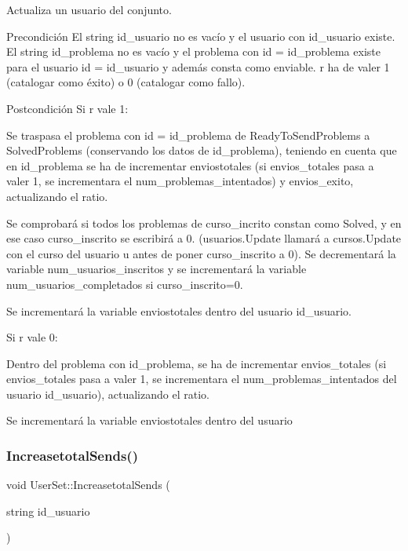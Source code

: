 Actualiza un usuario del conjunto. 

\begin{DoxyPrecond}{Precondición}
El string id\+\_\+usuario no es vacío y el usuario con id\+\_\+usuario existe. El string id\+\_\+problema no es vacío y el problema con id = id\+\_\+problema existe para el usuario id = id\+\_\+usuario y además consta como enviable. r ha de valer 1 (catalogar como éxito) o 0 (catalogar como fallo). 
\end{DoxyPrecond}
\begin{DoxyPostcond}{Postcondición}
Si r vale 1\+:
\begin{DoxyItemize}
\item Se traspasa el problema con id = id\+\_\+problema de Ready\+To\+Send\+Problems a Solved\+Problems (conservando los datos de id\+\_\+problema), teniendo en cuenta que en id\+\_\+problema se ha de incrementar enviostotales (si envios\+\_\+totales pasa a ~\newline
 valer 1, se incrementara el num\+\_\+problemas\+\_\+intentados) y envios\+\_\+exito, actualizando el ratio.
\item Se comprobará si todos los problemas de curso\+\_\+incrito constan como Solved, y en ese caso curso\+\_\+inscrito se escribirá a 0. (usuarios.\+Update llamará a cursos.\+Update con el curso del usuario u antes de poner curso\+\_\+inscrito a 0). Se decrementará la variable num\+\_\+usuarios\+\_\+inscritos y se incrementará la variable num\+\_\+usuarios\+\_\+completados si curso\+\_\+inscrito=0.
\item Se incrementará la variable enviostotales dentro del usuario id\+\_\+usuario.
\end{DoxyItemize}
\end{DoxyPostcond}
Si r vale 0\+:
\begin{DoxyItemize}
\item Dentro del problema con id\+\_\+problema, se ha de incrementar envios\+\_\+totales (si envios\+\_\+totales pasa a valer 1, se incrementara el num\+\_\+problemas\+\_\+intentados del usuario id\+\_\+usuario), actualizando el ratio.
\item Se incrementará la variable enviostotales dentro del usuario 
\end{DoxyItemize}\mbox{\label{class_user_set_a9900fead5f07b95a78418787914de06f}} 
\subsubsection{\texorpdfstring{Increasetotal\+Sends()}{IncreasetotalSends()}}
{\footnotesize\ttfamily void User\+Set\+::\+Increasetotal\+Sends (\begin{DoxyParamCaption}\item[{string}]{id\+\_\+usuario }\end{DoxyParamCaption})}



